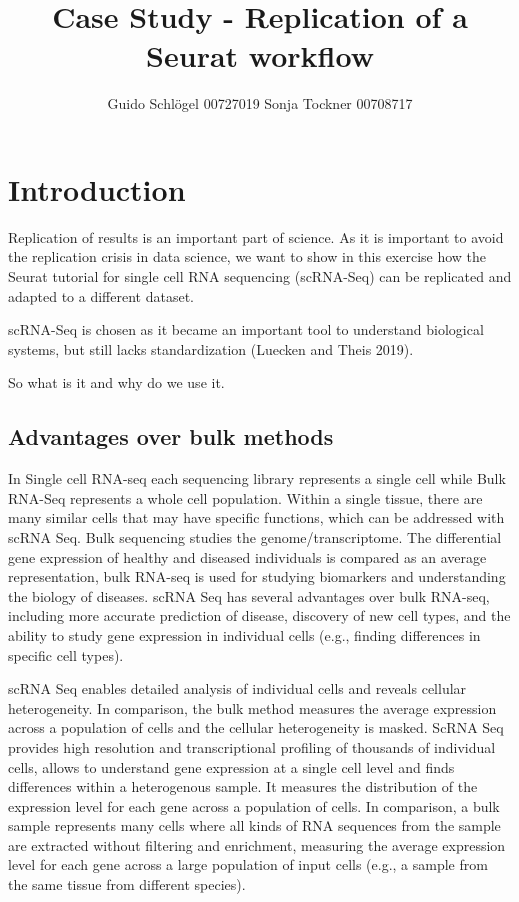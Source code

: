 \documentclass[a4paper, 10pt]{scrartcl}
\title{Case Study - Replication of a Seurat
workflow}
\author{Guido Schlögel 00727019 Sonja Tockner 00708717}
\begin{document}
\maketitle  

\hypertarget{introduction}{%
\section{Introduction}\label{introduction}}

Replication of results is an important part of science. As it is
important to avoid the replication crisis in data science, we want to
show in this exercise how the Seurat tutorial for single cell RNA
sequencing (scRNA-Seq) can be replicated and adapted to a different
dataset.

scRNA-Seq is chosen as it became an important tool to understand
biological systems, but still lacks standardization (Luecken and Theis
2019).

So what is it and why do we use it.

\hypertarget{advantages-over-bulk-methods}{%
\subsection{Advantages over bulk
methods}\label{advantages-over-bulk-methods}}

In Single cell RNA-seq each sequencing library represents a single cell
while Bulk RNA-Seq represents a whole cell population. Within a single
tissue, there are many similar cells that may have specific functions,
which can be addressed with scRNA Seq. Bulk sequencing studies the
genome/transcriptome. The differential gene expression of healthy and
diseased individuals is compared as an average representation, bulk
RNA-seq is used for studying biomarkers and understanding the biology of
diseases. scRNA Seq has several advantages over bulk RNA-seq, including
more accurate prediction of disease, discovery of new cell types, and
the ability to study gene expression in individual cells (e.g., finding
differences in specific cell types).

scRNA Seq enables detailed analysis of individual cells and reveals
cellular heterogeneity. In comparison, the bulk method measures the
average expression across a population of cells and the cellular
heterogeneity is masked. ScRNA Seq provides high resolution and
transcriptional profiling of thousands of individual cells, allows to
understand gene expression at a single cell level and finds differences
within a heterogenous sample. It measures the distribution of the
expression level for each gene across a population of cells. In
comparison, a bulk sample represents many cells where all kinds of RNA
sequences from the sample are extracted without filtering and
enrichment, measuring the average expression level for each gene across
a large population of input cells (e.g., a sample from the same tissue
from different species).
\end{document}
